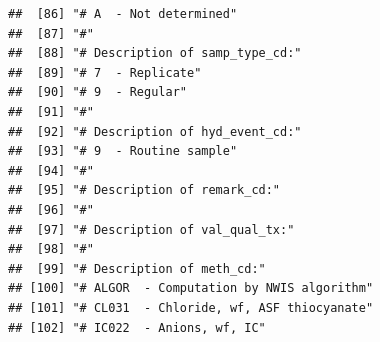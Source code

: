 \documentclass[
]{book}
\begin{document}
\begin{verbatim}
##  [86] "# A  - Not determined"                                                                                                                        
##  [87] "#"                                                                                                                                            
##  [88] "# Description of samp_type_cd:"                                                                                                               
##  [89] "# 7  - Replicate"                                                                                                                             
##  [90] "# 9  - Regular"                                                                                                                               
##  [91] "#"                                                                                                                                            
##  [92] "# Description of hyd_event_cd:"                                                                                                               
##  [93] "# 9  - Routine sample"                                                                                                                        
##  [94] "#"                                                                                                                                            
##  [95] "# Description of remark_cd:"                                                                                                                  
##  [96] "#"                                                                                                                                            
##  [97] "# Description of val_qual_tx:"                                                                                                                
##  [98] "#"                                                                                                                                            
##  [99] "# Description of meth_cd:"                                                                                                                    
## [100] "# ALGOR  - Computation by NWIS algorithm"                                                                                                     
## [101] "# CL031  - Chloride, wf, ASF thiocyanate"                                                                                                     
## [102] "# IC022  - Anions, wf, IC"                                                                                                                    

\end{verbatim}
\end{document}
